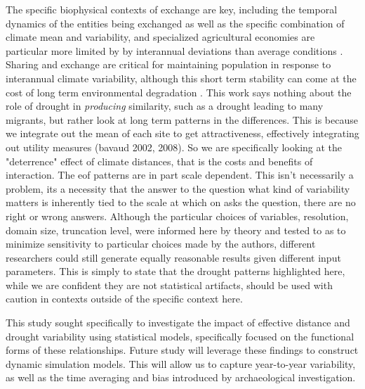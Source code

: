 \documentclass[fleqn,10pt]{wlscirep}
\begin{document}
The specific biophysical contexts of exchange are key, including the temporal dynamics of the entities being exchanged as well as the specific combination of climate mean and variability, and specialized agricultural economies are particular more limited by by interannual deviations than average conditions \cite{Freeman2014}. Sharing and exchange are critical for maintaining population in response to interannual climate variability, although this short term stability can come at the cost of long term environmental degradation \cite{Janssen2010}.
This work says nothing about the role of drought in \textit{producing} similarity, such as a drought leading to many migrants, but rather look at long term patterns in the differences. This is because we integrate out the mean of each site to get attractiveness, effectively integrating out utility measures (bavaud 2002, 2008). So we are specifically looking at the "deterrence" effect of climate distances, that is the costs and benefits of interaction.
The eof patterns are in part scale dependent. This isn't necessarily a problem, its a necessity that the answer to the question what kind of variability matters is inherently tied to the scale at which on asks the question, there are no right or wrong answers. Although the particular choices of variables, resolution, domain size, truncation level, were informed here by theory and tested to as to minimize sensitivity to particular choices made by the authors, different researchers could still generate equally reasonable results given  different input parameters.  This is simply to state that the drought patterns highlighted here, while we are confident they are not statistical artifacts, should be used with caution in contexts outside of the specific context here.

This study sought specifically to investigate the impact of effective distance and drought variability using statistical models, specifically focused on the functional forms of these relationships. Future study will leverage these findings to construct dynamic simulation models. This will allow us to capture year-to-year variability, as well as the time averaging and bias introduced by archaeological investigation.
\end{document}
